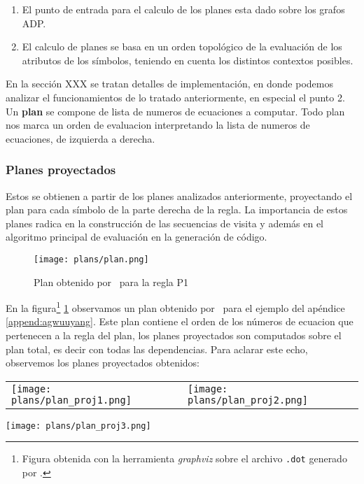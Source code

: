 \begin{enumerate}
\item El punto de entrada para el calculo de los planes esta dado sobre los grafos ADP. 
\item El calculo de planes se basa en un orden topológico de la evaluación de los atributos de los símbolos, teniendo en cuenta los distintos contextos posibles.
\end{enumerate}
En la sección XXX se tratan detalles de implementación, en donde podemos analizar el funcionamientos de lo tratado anteriormente, en especial el punto 2.
Un \textbf{plan} se compone de lista de numeros de ecuaciones a computar. Todo plan nos marca un orden de evaluacion interpretando la lista de numeros de ecuaciones, de izquierda a derecha.

\subsubsection*{Planes proyectados}
Estos se obtienen a partir de los planes analizados anteriormente, proyectando el plan para cada símbolo de la parte derecha de la regla. La importancia de estos planes radica en la construcción de las secuencias de visita y además en el algoritmo principal de evaluación en la generación de código.
\begin{figure}\centering
 \texttt{[image: plans/plan.png]}
\caption{\label{fig:plan}Plan obtenido por \maggen\ para la regla P1}
\end{figure}

En la figura\footnote{Figura obtenida con la herramienta \textit{graphviz} sobre el archivo \texttt{.dot} generado por \maggen.} \ref{fig:plan} observamos un plan obtenido por \maggen\ para el ejemplo del apéndice \ref{append:agwuuyang}. Este plan contiene el orden de los números de ecuacion que pertenecen a la regla del plan, los planes proyectados son computados sobre el plan total, es decir con todas las dependencias. Para aclarar este echo, observemos los planes proyectados obtenidos:\\

\begin{tabular}{l l}
\texttt{[image: plans/plan\_proj1.png]} &
\texttt{[image: plans/plan\_proj2.png]} 
\end{tabular}
\begin{center}
 \texttt{[image: plans/plan\_proj3.png]}
\end{center}

